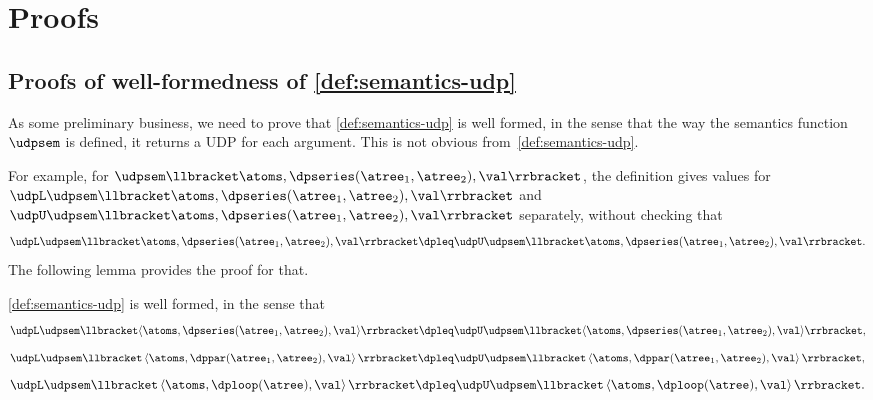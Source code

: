 \section{Proofs}

\subsection{Proofs of well-formedness of \cref{def:semantics-udp}}

As some preliminary business, we need to prove that \cref{def:semantics-udp}
is well formed, in the sense that the way the semantics function~$\udpsem$
is defined, it returns a UDP for each argument. This is not obvious
from~\cref{def:semantics-udp}.

For example, for $\udpsem\llbracket\atoms,\dpseries(\atree_{1},\atree_{2}),\val\rrbracket$,
the definition gives values for~$\udpL\udpsem\llbracket\atoms,\dpseries(\atree_{1},\atree_{2}),\val\rrbracket$
and~$\udpU\udpsem\llbracket\atoms,\dpseries(\atree_{1},\atree_{2}),\val\rrbracket$
separately, without checking that
\[
    \udpL\udpsem\llbracket\atoms,\dpseries(\atree_{1},\atree_{2}),\val\rrbracket\dpleq\udpU\udpsem\llbracket\atoms,\dpseries(\atree_{1},\atree_{2}),\val\rrbracket.
\]
The following lemma provides the proof for that.
\begin{lemma}
    \label{lem:udpsem-well-formed}\cref{def:semantics-udp} is well
    formed, in the sense that {\small{}
        \begin{equation}
            \udpL\udpsem\llbracket\langle\atoms,\dpseries(\atree_{1},\atree_{2}),\val\rangle\rrbracket\dpleq\udpU\udpsem\llbracket\langle\atoms,\dpseries(\atree_{1},\atree_{2}),\val\rangle\rrbracket,\label{eq:wf1}
        \end{equation}
        \begin{equation}
            \udpL\udpsem\llbracket\left\langle \atoms,\dppar(\atree_{1},\atree_{2}),\val\right\rangle \rrbracket\dpleq\udpU\udpsem\llbracket\left\langle \atoms,\dppar(\atree_{1},\atree_{2}),\val\right\rangle \rrbracket,\label{eq:wf2}
        \end{equation}
        \begin{equation}
            \udpL\udpsem\llbracket\left\langle \atoms,\dploop(\atree),\val\right\rangle \rrbracket\dpleq\udpU\udpsem\llbracket\left\langle \atoms,\dploop(\atree),\val\right\rangle \rrbracket.\label{eq:wf3}
        \end{equation}
    }{\small \par}
\end{lemma}
